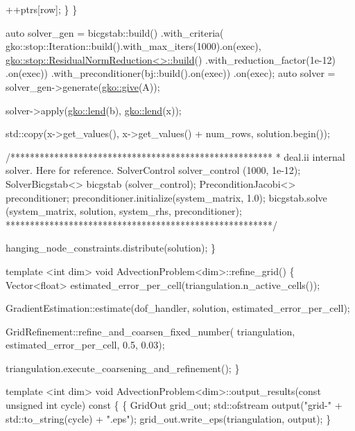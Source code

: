 \begin{DoxyCodeInclude}
            ++ptrs[row];
        \}
    \}

    \textcolor{keyword}{auto} solver\_gen =
        bicgstab::build()
            .with\_criteria(
                gko::stop::Iteration::build().with\_max\_iters(1000).on(exec),
                \hyperlink{classgko_1_1stop_1_1ResidualNormReduction}{gko::stop::ResidualNormReduction<>::build}()
                    .with\_reduction\_factor(1e-12)
                    .on(exec))
            .with\_preconditioner(bj::build().on(exec))
            .on(exec);
    \textcolor{keyword}{auto} solver = solver\_gen->generate(\hyperlink{namespacegko_acbd3fd6d07e498892881e8e2ab0b4167}{gko::give}(A));

    solver->apply(\hyperlink{namespacegko_aa8cb4876b72e5e1036ea9575443c439b}{gko::lend}(b), \hyperlink{namespacegko_aa8cb4876b72e5e1036ea9575443c439b}{gko::lend}(x));

    std::copy(x->get\_values(), x->get\_values() + num\_rows, solution.begin());

    \textcolor{comment}{/******************************************************}
\textcolor{comment}{     * deal.ii internal solver. Here for reference.}
\textcolor{comment}{     SolverControl           solver\_control (1000, 1e-12);}
\textcolor{comment}{     SolverBicgstab<>        bicgstab (solver\_control);}
\textcolor{comment}{}
\textcolor{comment}{     PreconditionJacobi<> preconditioner;}
\textcolor{comment}{     preconditioner.initialize(system\_matrix, 1.0);}
\textcolor{comment}{}
\textcolor{comment}{     bicgstab.solve (system\_matrix, solution, system\_rhs,}
\textcolor{comment}{                     preconditioner);}
\textcolor{comment}{    *******************************************************/}

    hanging\_node\_constraints.distribute(solution);
\}


\textcolor{keyword}{template} <\textcolor{keywordtype}{int} dim>
\textcolor{keywordtype}{void} AdvectionProblem<dim>::refine\_grid()
\{
    Vector<float> estimated\_error\_per\_cell(triangulation.n\_active\_cells());

    GradientEstimation::estimate(dof\_handler, solution,
                                 estimated\_error\_per\_cell);

    GridRefinement::refine\_and\_coarsen\_fixed\_number(
        triangulation, estimated\_error\_per\_cell, 0.5, 0.03);

    triangulation.execute\_coarsening\_and\_refinement();
\}


\textcolor{keyword}{template} <\textcolor{keywordtype}{int} dim>
\textcolor{keywordtype}{void} AdvectionProblem<dim>::output\_results(\textcolor{keyword}{const} \textcolor{keywordtype}{unsigned} \textcolor{keywordtype}{int} cycle)\textcolor{keyword}{ const}
\textcolor{keyword}{}\{
    \{
        GridOut grid\_out;
        std::ofstream output(\textcolor{stringliteral}{"grid-"} + std::to\_string(cycle) + \textcolor{stringliteral}{".eps"});
        grid\_out.write\_eps(triangulation, output);
    \}


\end{DoxyCodeInclude}
